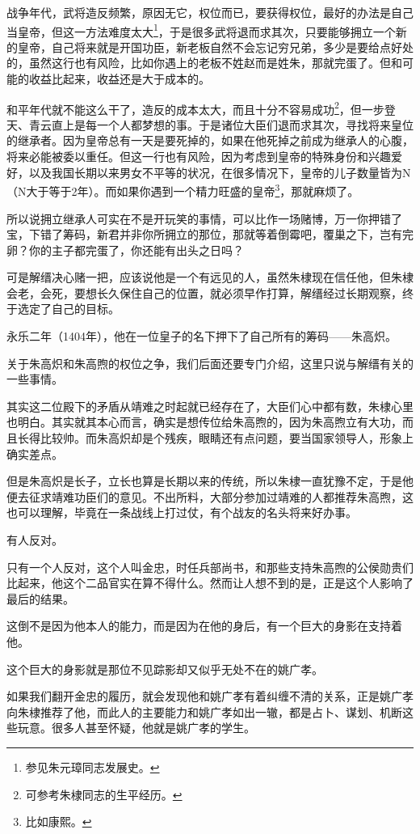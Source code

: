 \begin{multicols}{\theparacolNo}
战争年代，武将造反频繁，原因无它，权位而已，要获得权位，最好的办法是自己当皇帝，但这一方法难度太大\footnote{参见朱元璋同志发展史。}，于是很多武将退而求其次，只要能够拥立一个新的皇帝，自己将来就是开国功臣，新老板自然不会忘记穷兄弟，多少是要给点好处的，虽然这行也有风险，比如你遇上的老板不姓赵而是姓朱，那就完蛋了。但和可能的收益比起来，收益还是大于成本的。

和平年代就不能这么干了，造反的成本太大，而且十分不容易成功\footnote{可参考朱棣同志的生平经历。}，但一步登天、青云直上是每一个人都梦想的事。于是诸位大臣们退而求其次，寻找将来皇位的继承者。因为皇帝总有一天是要死掉的，如果在他死掉之前成为继承人的心腹，将来必能被委以重任。但这一行也有风险，因为考虑到皇帝的特殊身份和兴趣爱好，以及我国长期以来男女不平等的状况，在很多情况下，皇帝的儿子数量皆为N（N大于等于2年）。而如果你遇到一个精力旺盛的皇帝\footnote{比如康熙。}，那就麻烦了。

所以说拥立继承人可实在不是开玩笑的事情，可以比作一场赌博，万一你押错了宝，下错了筹码，新君并非你所拥立的那位，那就等着倒霉吧，覆巢之下，岂有完卵？你的主子都完蛋了，你还能有出头之日吗？

可是解缙决心赌一把，应该说他是一个有远见的人，虽然朱棣现在信任他，但朱棣会老，会死，要想长久保住自己的位置，就必须早作打算，解缙经过长期观察，终于选定了自己的目标。

永乐二年（1404年），他在一位皇子的名下押下了自己所有的筹码——朱高炽。

关于朱高炽和朱高煦的权位之争，我们后面还要专门介绍，这里只说与解缙有关的一些事情。

其实这二位殿下的矛盾从靖难之时起就已经存在了，大臣们心中都有数，朱棣心里也明白。其实就其本心而言，确实是想传位给朱高煦的，因为朱高煦立有大功，而且长得比较帅。而朱高炽却是个残疾，眼睛还有点问题，要当国家领导人，形象上确实差点。

但是朱高炽是长子，立长也算是长期以来的传统，所以朱棣一直犹豫不定，于是他便去征求靖难功臣们的意见。不出所料，大部分参加过靖难的人都推荐朱高煦，这也可以理解，毕竟在一条战线上打过仗，有个战友的名头将来好办事。

有人反对。

只有一个人反对，这个人叫金忠，时任兵部尚书，和那些支持朱高煦的公侯勋贵们比起来，他这个二品官实在算不得什么。然而让人想不到的是，正是这个人影响了最后的结果。

这倒不是因为他本人的能力，而是因为在他的身后，有一个巨大的身影在支持着他。

这个巨大的身影就是那位不见踪影却又似乎无处不在的姚广孝。

如果我们翻开金忠的履历，就会发现他和姚广孝有着纠缠不清的关系，正是姚广孝向朱棣推荐了他，而此人的主要能力和姚广孝如出一辙，都是占卜、谋划、机断这些玩意。很多人甚至怀疑，他就是姚广孝的学生。


\end{multicols}

